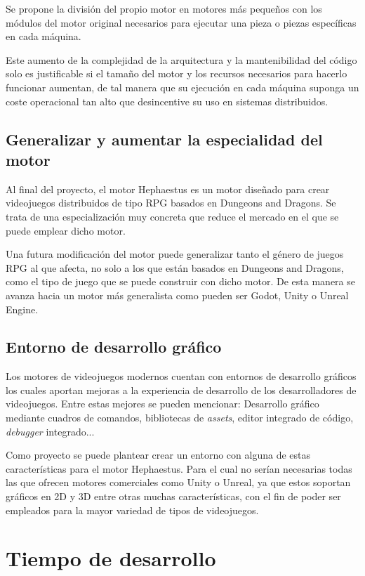 Se propone la división del propio motor en motores más pequeños con los módulos del motor original necesarios para ejecutar una pieza o piezas específicas en cada máquina.

Este aumento de la complejidad de la arquitectura y la mantenibilidad del código solo es justificable si el tamaño del motor y los recursos necesarios para hacerlo funcionar aumentan, de tal manera que su ejecución en cada máquina suponga un coste operacional tan alto que desincentive su uso en sistemas distribuidos.

\subsection{Generalizar y aumentar la especialidad del motor}

Al final del proyecto, el motor Hephaestus es un motor diseñado para crear videojuegos distribuidos de tipo RPG basados en Dungeons and Dragons. Se trata de una especialización muy concreta que reduce el mercado en el que se puede emplear dicho motor.

Una futura modificación del motor puede generalizar tanto el género de juegos RPG al que afecta, no solo a los que están basados en Dungeons and Dragons, como el tipo de juego que se puede construir con dicho motor. De esta manera se avanza hacia un motor más generalista como pueden ser Godot, Unity o Unreal Engine.

\subsection{Entorno de desarrollo gráfico}

Los motores de videojuegos modernos cuentan con entornos de desarrollo gráficos los cuales aportan mejoras a la experiencia de desarrollo de los desarrolladores de videojuegos. Entre estas mejores se pueden mencionar: Desarrollo gráfico mediante cuadros de comandos, bibliotecas de \textit{assets}, editor integrado de código, \textit{debugger} integrado...

Como proyecto se puede plantear crear un entorno con alguna de estas características para el motor Hephaestus. Para el cual no serían necesarias todas las que ofrecen motores comerciales como Unity o Unreal, ya que estos soportan gráficos en 2D y 3D entre otras muchas características, con el fin de poder ser empleados para la mayor variedad de tipos de videojuegos.

\section{Tiempo de desarrollo}

